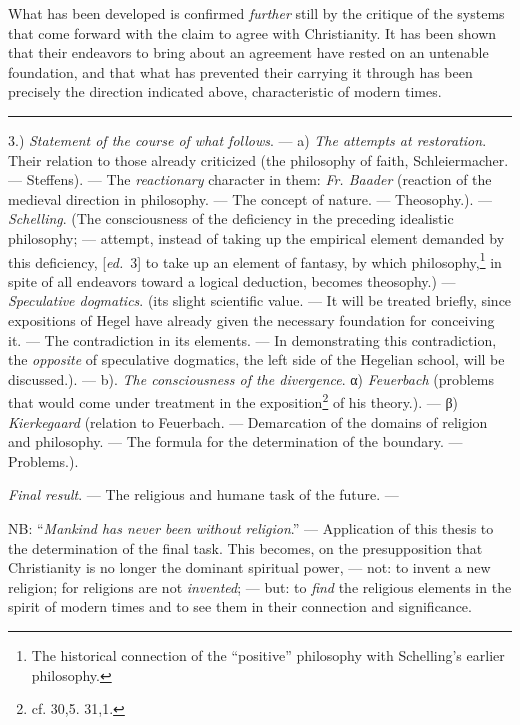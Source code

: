 \documentclass[12pt,a4paper,openany]{book}
\newcommand{\kpage}[1]{\marginnote{\footnotesize\textit{[#1]}}}
\newcommand{\ed}[1]{{\small[\textit{ed.}\ #1]}}
\newcommand{\sepline}{\par\begin{center}\rule{2cm}{0.4pt}\end{center}\par}
\begin{document}
What has been developed is confirmed \emph{further} still by the critique of the systems
that come forward with the claim to agree with
\kpage{94}Christianity. It has been shown that their endeavors to bring about
an agreement have rested on an untenable
foundation, and that what has prevented their carrying it through has been precisely
the direction indicated above, characteristic of modern times.

\sepline

3.) \emph{Statement of the course of what follows}. --- a) \emph{The attempts at restoration}. Their
relation to those already criticized (the philosophy of faith, Schleiermacher.
--- Steffens). --- The \emph{reactionary} character in them: \emph{Fr. Baader}
(reaction of the medieval direction in philosophy. --- The concept of nature.
--- Theosophy.). --- \emph{Schelling}. (The consciousness of the deficiency
in the preceding idealistic philosophy; --- attempt,
instead of taking up the empirical element demanded by this deficiency,
\ed{3} to take up an element of fantasy, by which philosophy,\footnote[19]{The historical connection of the ``positive'' philosophy with Schelling's earlier
philosophy.}
in spite of all endeavors toward a logical deduction, becomes theosophy.)
--- \emph{Speculative dogmatics}. (its slight scientific value. --- It
will be treated briefly, since expositions of Hegel have already
given the necessary foundation for conceiving it. --- The contradiction in its
elements. --- In demonstrating this contradiction,
the \emph{opposite} of speculative dogmatics, the left
side of the Hegelian school, will be discussed.). --- b). \emph{The consciousness of the divergence}. α) \emph{Feuerbach}
(problems that would come under treatment in the exposition\footnote[20]{cf. 30,5. 31,1.}
of his theory.). --- β) \emph{Kierkegaard} (relation to Feuerbach.
--- Demarcation of the domains of religion and philosophy. --- The formula
for the determination of the boundary. --- Problems.).

\emph{Final result}. --- The religious and humane task of the future. ---

NB: ``\emph{Mankind has never been without religion}.'' --- Application of
this thesis to the determination of the final task. This
becomes, on the presupposition that Christianity is no longer
the dominant spiritual power, --- not: to invent a new religion;
for religions are not \emph{invented}; --- but: to \emph{find} the religious elements in
\kpage{95}the spirit of modern times and to see them in their connection and significance.
\end{document}

